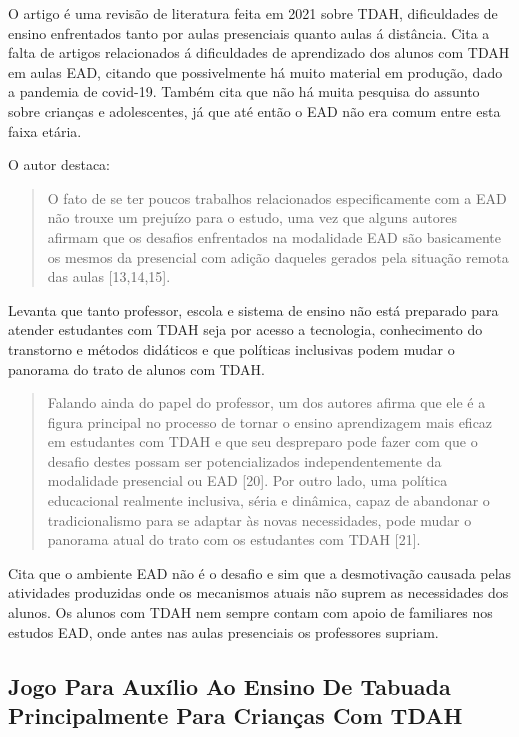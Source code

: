 O artigo\cite{okuyama} é uma revisão de literatura feita em 2021 sobre TDAH, dificuldades de ensino enfrentados tanto por aulas presenciais quanto aulas á distância. Cita a falta de artigos relacionados á dificuldades de aprendizado dos alunos com TDAH em aulas EAD, citando que possivelmente há muito material em produção, dado a pandemia de covid-19. Também cita que não há muita pesquisa do assunto sobre crianças e adolescentes, já que até então o EAD não era comum entre esta faixa etária. 

O autor destaca:

\begin{quote}
O fato de se ter poucos trabalhos relacionados especificamente com a EAD não trouxe um prejuízo para o estudo, uma vez que alguns autores afirmam que os desafios enfrentados na modalidade EAD são basicamente os mesmos da presencial com adição daqueles gerados pela situação remota das aulas [13,14,15].\cite{okuyama}
\end{quote}

Levanta que tanto professor, escola e sistema de ensino não está preparado para atender estudantes com TDAH seja por acesso a tecnologia, conhecimento do transtorno e métodos didáticos e que políticas inclusivas podem mudar o panorama do trato de alunos com TDAH. 

\begin{quote}
Falando ainda do papel do professor, um dos autores afirma que ele é a figura principal no processo de tornar o ensino aprendizagem mais eficaz em estudantes com TDAH e que seu despreparo pode fazer com que o desafio destes possam ser potencializados independentemente da modalidade presencial ou EAD [20]. Por outro lado, uma política educacional realmente inclusiva, séria e dinâmica, capaz de abandonar o tradicionalismo para se adaptar às novas necessidades, pode mudar o panorama atual do trato com os estudantes com TDAH [21].\cite{okuyama}
\end{quote}

Cita que o ambiente EAD não é o desafio e sim que a desmotivação causada pelas atividades produzidas onde os mecanismos atuais não suprem as necessidades dos alunos. Os alunos com TDAH nem sempre contam com apoio de familiares nos estudos EAD, onde antes nas aulas presenciais os professores supriam. 


\subsection{Jogo Para Auxílio Ao Ensino De Tabuada Principalmente Para Crianças Com TDAH}

